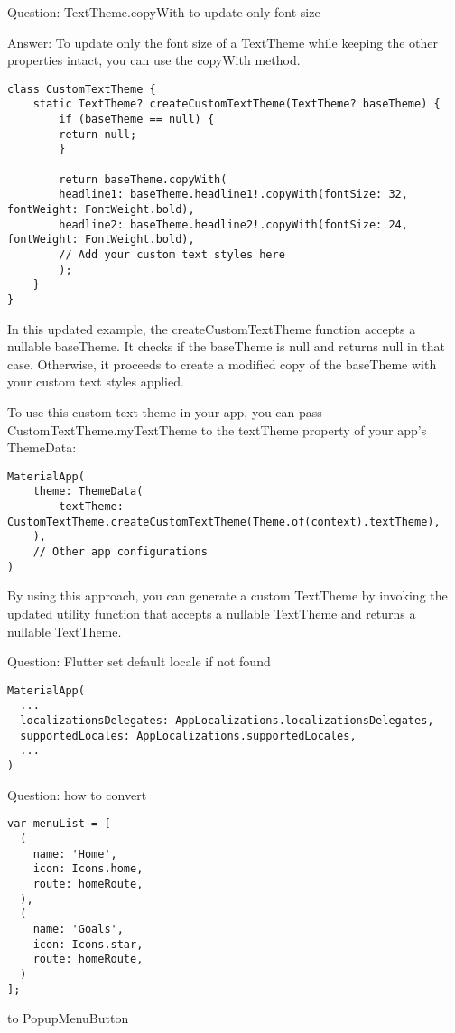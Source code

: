 Question: TextTheme.copyWith to update only font size

Answer: To update only the font size of a TextTheme while keeping the other properties intact, you can use the 
copyWith method. 

\begin{lstlisting}
class CustomTextTheme {
    static TextTheme? createCustomTextTheme(TextTheme? baseTheme) {
        if (baseTheme == null) {
        return null;
        }
        
        return baseTheme.copyWith(
        headline1: baseTheme.headline1!.copyWith(fontSize: 32, fontWeight: FontWeight.bold),
        headline2: baseTheme.headline2!.copyWith(fontSize: 24, fontWeight: FontWeight.bold),
        // Add your custom text styles here
        );
    }
}     
\end{lstlisting}

In this updated example, the createCustomTextTheme function accepts a nullable baseTheme. It checks if the 
baseTheme is null and returns null in that case. Otherwise, it proceeds to create a modified copy of the 
baseTheme with your custom text styles applied.

To use this custom text theme in your app, you can pass CustomTextTheme.myTextTheme to the textTheme property of 
your app's ThemeData:

\begin{lstlisting}
MaterialApp(
    theme: ThemeData(
        textTheme: CustomTextTheme.createCustomTextTheme(Theme.of(context).textTheme),
    ),
    // Other app configurations
)   
\end{lstlisting}

By using this approach, you can generate a custom TextTheme by invoking the updated utility function that accepts a 
nullable TextTheme and returns a nullable TextTheme.


Question: Flutter set default locale if not found

\begin{lstlisting}
MaterialApp(
  ...
  localizationsDelegates: AppLocalizations.localizationsDelegates,
  supportedLocales: AppLocalizations.supportedLocales,
  ...
)
\end{lstlisting}



Question: how to convert
\begin{lstlisting}
var menuList = [
  (
    name: 'Home',
    icon: Icons.home,
    route: homeRoute,
  ),
  (
    name: 'Goals',
    icon: Icons.star,
    route: homeRoute,
  )
];
\end{lstlisting}
to PopupMenuButton

